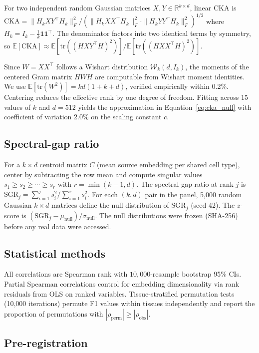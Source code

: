 \documentclass[11pt]{article}
\newcommand{\R}{\mathbb{R}}
\begin{document}
For two independent random Gaussian matrices $X, Y \in \R^{k \times d}$,
linear CKA is $\mathrm{CKA} = \|H_k X Y^\top H_k\|_F^2 / (\|H_k X
X^\top H_k\|_F^2 \cdot \|H_k Y Y^\top H_k\|_F^2)^{1/2}$ where
$H_k = I_k - \frac{1}{k}\mathbf{1}\mathbf{1}^\top$. The denominator
factors into two identical terms by symmetry, so
$\mathbb{E}[\mathrm{CKA}] \approx \mathbb{E}[\mathrm{tr}((HXY^\top
H)^2)] / \mathbb{E}[\mathrm{tr}((HXX^\top H)^2)]$.

Since $W = XX^\top$ follows a Wishart distribution
$\mathcal{W}_k(d, I_k)$, the moments of the centered Gram matrix $HWH$
are computable from Wishart moment identities. We use
$\mathbb{E}[\mathrm{tr}(W^2)] = kd(1 + k + d)$, verified empirically
within 0.2\%. Centering reduces the effective rank by one degree of
freedom. Fitting across 15 values of $k$ and $d = 512$ yields the
approximation in Equation~\ref{eq:cka_null} with coefficient of
variation 2.0\% on the scaling constant $c$.

\subsection{Spectral-gap ratio}
\label{sec:sgrmethod}

For a $k \times d$ centroid matrix $C$ (mean source embedding per
shared cell type), center by subtracting the row mean and compute
singular values $s_1 \geq s_2 \geq \cdots \geq s_r$ with $r =
\min(k{-}1, d)$. The spectral-gap ratio at rank $j$ is $\mathrm{SGR}_j
= \sum_{i=1}^j s_i^2 / \sum_{i=1}^r s_i^2$. For each $(k, d)$ pair in
the panel, 5,000 random Gaussian $k \times d$ matrices define the null
distribution of $\mathrm{SGR}_j$ (seed 42). The $z$-score is
$({\mathrm{SGR}_j - \mu_{\mathrm{null}}}) / {\sigma_{\mathrm{null}}}$.
The null distributions were frozen (SHA-256) before any real data were
accessed.

\subsection{Statistical methods}

All correlations are Spearman rank with $10{,}000$-resample bootstrap
95\% CIs. Partial Spearman correlations control for embedding
dimensionality via rank residuals from OLS on ranked variables.
Tissue-stratified permutation tests (10,000 iterations) permute F1
values within tissues independently and report the proportion of
permutations with $|\rho_{\mathrm{perm}}| \geq |\rho_{\mathrm{obs}}|$.

\subsection{Pre-registration}
\end{document}
